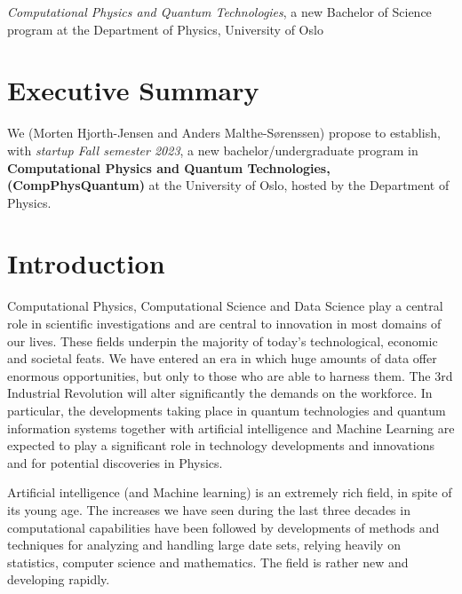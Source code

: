 \documentclass[oneside,final,10pt]{article}
\begin{document}
\thispagestyle{empty}

\begin{center}
{\LARGE\bf
\begin{spacing}{1.25}
{\em Computational Physics and Quantum Technologies}, a new Bachelor of Science program  at the Department of Physics, University of Oslo
\end{spacing}
}
\end{center}



\vspace{1cm}


\section*{Executive Summary}

We (Morten Hjorth-Jensen and Anders Malthe-Sørenssen) propose to establish, with {\em startup Fall semester 2023}, a new bachelor/undergraduate program in {\bf Computational Physics and Quantum Technologies, (CompPhysQuantum)}  at the University of Oslo, hosted by the Department of Physics. 

\section{Introduction}

Computational Physics, Computational Science  and Data Science play a central role in scientific investigations and are central to innovation in most domains of our lives. These fields underpin the majority of today's technological, economic and societal feats. We have entered an era in which huge amounts of data offer enormous opportunities, but only to those who are able to harness them. The 3rd Industrial Revolution will alter significantly the demands on the workforce. In particular, the developments taking place in quantum technologies and quantum information systems together with artificial intelligence and Machine Learning are expected to play a significant role in technology developments and innovations and for potential discoveries in Physics.

Artificial intelligence (and Machine learning)  is an extremely rich field, in spite of its young age. The
increases we have seen during the last three decades in computational
capabilities have been followed by developments of methods and
techniques for analyzing and handling large date sets, relying heavily
on statistics, computer science and mathematics.  The field is rather
new and developing rapidly. 
\end{document}
